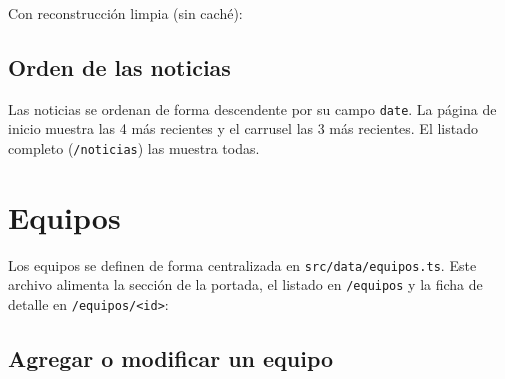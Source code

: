 \documentclass[12pt,a4paper]{report}
\begin{document}

Con reconstrucción limpia (sin caché):


\subsection{Orden de las noticias}

Las noticias se ordenan de forma descendente por su campo \texttt{date}. La
página de inicio muestra las 4 más recientes y el carrusel las 3 más
recientes. El listado completo (\texttt{/noticias}) las muestra todas.

\section{Equipos}

Los equipos se definen de forma centralizada en \texttt{src/data/equipos.ts}.
Este archivo alimenta la sección de la portada, el listado en
\texttt{/equipos} y la ficha de detalle en \texttt{/equipos/<id>}:


\subsection{Agregar o modificar un equipo}
\end{document}
